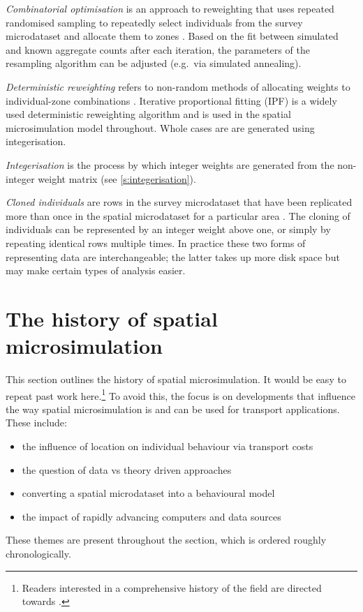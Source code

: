 \emph{Combinatorial optimisation}  is an
approach to reweighting that uses repeated randomised sampling to
repeatedly select individuals from the survey microdataset and allocate them to
zones \citep{Williamson1998, Voas2000}. Based on the fit between simulated
and known aggregate counts after each
iteration, the parameters of the resampling algorithm can be adjusted (e.g.~via
simulated annealing).

\emph{Deterministic reweighting} refers to non-random methods of allocating
weights to individual-zone combinations \citep{Ballas2007simb, Tomintz2008}.
Iterative proportional fitting (IPF)
is a widely used deterministic reweighting algorithm and is used in the
spatial microsimulation model throughout. Whole cases are
are generated using integerisation.

\emph{Integerisation} is the process by which integer weights are generated
from the non-integer weight matrix (see \cref{s:integerisation}).

\emph{Cloned individuals}  are rows in the survey microdataset
that have been replicated more than once in the spatial microdataset for a
particular area \citep{Smith2009}.
The cloning of individuals can be represented by an integer
weight above one, or simply by repeating identical rows multiple times. In
practice these two forms of representing data are interchangeable; the latter
takes up more disk space \citep{Holm1996} but may make certain types of analysis
easier.


\section{The history of spatial microsimulation}
\label{s:history}
This section outlines the history of spatial microsimulation. It would
be easy to repeat past work here.\footnote{Readers interested in a
comprehensive history of the field are directed towards
\citet{Ballas2009-sage}.} To avoid this, the focus is on
developments that influence the way spatial microsimulation
is and can be used for transport applications. These include:
\begin{itemize}
 \item the influence of location on individual behaviour via
 transport costs 
 \item the question of data vs theory driven approaches
 \item converting a spatial microdataset into a behavioural model
 \item the impact of rapidly advancing computers and data sources
\end{itemize}
These themes are present throughout the section, which is ordered
roughly chronologically.

